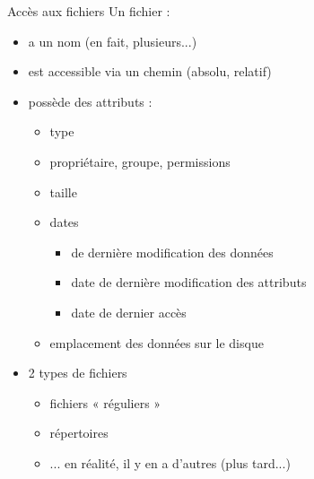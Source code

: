 \def\inc{inc1-2-file}




\begin {frame} {Accès aux fichiers}
    Un fichier :
    \begin {itemize}
	\item a un nom (en fait, plusieurs...)
	\item est accessible via un chemin (absolu, relatif)
	\item possède des attributs :
	    \begin {itemize}
		\item type
		\item propriétaire, groupe, permissions
		\item taille
		\item dates
		    \begin {itemize}
			\item de dernière modification des données
			\item date de dernière modification des attributs
			\item date de dernier accès
		    \end {itemize}
		\item emplacement des données sur le disque
	    \end {itemize}
	\item 2 types de fichiers
	    \begin {itemize}
		\item fichiers « réguliers »
		\item répertoires
		\item ... en réalité, il y en a d'autres (plus tard...)
	    \end {itemize}
    \end {itemize}
\end {frame}

